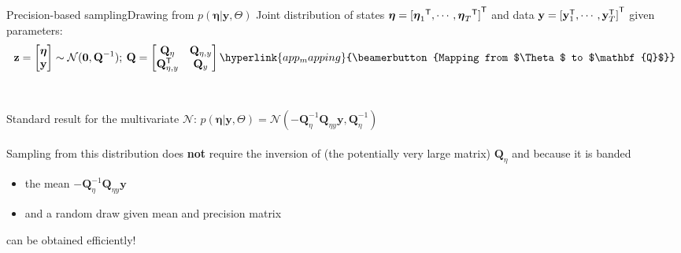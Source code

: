 \documentclass[xcolor=svgnames, 10pt, aspectratio=169]{beamer}
\newcommand\transpose[1]{{#1}^{\sf{T}}}
\begin{document}
\begin{frame}[fragile]{Precision-based sampling}{Drawing from $p(\boldsymbol{\eta} | \mathbf{y}, \Theta)$}
    \label{precsampl_draw_eta}
    Joint distribution of states $\boldsymbol{\eta} = \transpose{[\transpose{\boldsymbol{\eta}_1}, \cdots, \transpose{\boldsymbol{\eta}_T}]}$ and data $\mathbf{y} = \transpose{[\transpose{\mathbf{y}}_1, \cdots, \transpose{\mathbf{y}}_T]}$ given parameters: 
    $$
            \mathbf{z} =
            \begin{bmatrix}
                \boldsymbol{\eta} \\ 
                \mathbf{y}
            \end{bmatrix}     
            \sim        
            \mathcal{N}(\mathbf{0}, \mathbf{Q}^{-1})
            ; \: \mathbf{Q} = 
            \begin{bmatrix}
                \mathbf{Q}_{\eta} & \mathbf{Q}_{\eta, y} \\
                \transpose{\mathbf{Q}}_{\eta, y} & \mathbf{Q}_{y}
            \end{bmatrix}   
            \hyperlink{app_mapping}{\beamerbutton{Mapping from $\Theta$ to $\mathbf{Q}$}} 
    $$ \\~\\    
    
    Standard result for the multivariate $\mathcal{N}$: $p(\boldsymbol{\eta} | \mathbf{y}, \Theta) = \mathcal{N}(-\mathbf{Q}_{\eta}^{-1} \mathbf{Q}_{\eta y} \mathbf{y}, \mathbf{Q}_{\eta}^{-1})$\\~\\

    Sampling from this distribution does \textbf{not} require the inversion of (the potentially very large matrix) $\mathbf{Q}_{\eta}$ and because it is banded 
    \vspace{0.2cm}
    \begin{itemize}
        \item the mean $-\mathbf{Q}_{\eta}^{-1} \mathbf{Q}_{\eta y} \mathbf{y}$ 
        \item and a random draw given mean and precision matrix 
    \end{itemize}
    \vspace{0.2cm}
    can be obtained efficiently! \hyperlink{app_rueheld_algs}{}
    
\end{frame}
\end{document}
